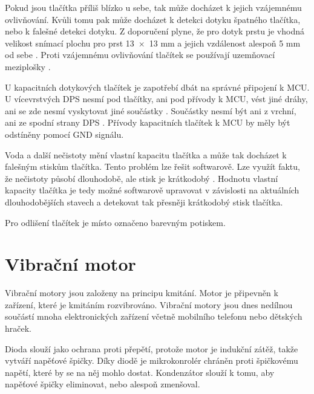 Pokud jsou tlačítka příliš blízko u sebe, tak může docházet k jejich vzájemnému ovlivňování. Kvůli tomu pak může docházet k
detekci dotyku špatného tlačítka, nebo k falešné detekci dotyku. Z doporučení plyne, že pro dotyk prstu je vhodná velikost snímací 
plochu pro prst 13~$\times$~13 mm a jejich vzdálenost alespoň 5 mm od sebe \cite{PrincipKapTl}. Proti vzájemnému ovlivňování tlačítek
se používají uzemňovací meziplošky \cite{PrincipKapTl}. 


U kapacitních dotykových tlačítek je zapotřebí dbát na správné připojení k MCU. U vícevrstvých DPS nesmí pod tlačítky, ani pod přívody
k MCU, vést jiné dráhy, ani se zde nesmí vyskytovat jiné součástky \cite{PrincipKapTl}. Součástky nesmí být ani z vrchní, ani ze spodní 
strany DPS \cite{PrincipKapTl}. Přívody kapacitních tlačítek k MCU by měly být odstíněny pomocí GND signálu.

Voda a další nečistoty mění vlastní kapacitu tlačítka a může tak docházet k falešným stiskům tlačítka. Tento problém lze řešit softwarově. 
Lze využít faktu, že nečistoty působí dlouhodobě, ale stisk je krátkodobý \cite{PrincipKapTl}. Hodnotu vlastní kapacity tlačítka je tedy
možné softwarově upravovat v závislosti na aktuálních dlouhodobějších stavech a detekovat tak přesněji krátkodobý stisk tlačítka.



Pro odlišení tlačítek je místo označeno barevným potiskem. 

\section{Vibrační motor}
Vibrační motory jsou založeny na principu kmitání. Motor je připevněn k zařízení, které je kmitáním rozvibrováno. Vibrační motory jsou dnes 
nedílnou součástí mnoha elektronických zařízení včetně mobilního telefonu nebo dětských hraček. 

Dioda slouží jako ochrana proti přepětí, protože motor je indukční zátěž, takže vytváří napěťové špičky. Díky diodě je mikrokonrolér chráněn 
proti špičkovému napětí, které by se na něj mohlo dostat. Kondenzátor slouží k tomu, aby napěťové špičky eliminovat, nebo alespoň zmenšoval. 

